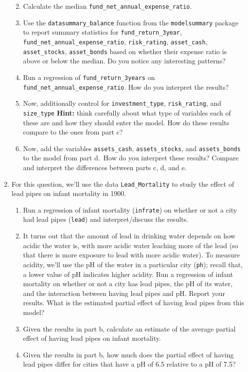 \documentclass[
  letterpaper,
  DIV=11,
  numbers=noendperiod]{scrreprt}
\begin{document}
\begin{enumerate}
  \begin{enumerate}
  \def\labelenumii{\alph{enumii})}
  \item
    Calculate the median \texttt{fund\_net\_annual\_expense\_ratio}.
  \item
    Use the \texttt{datasummary\_balance} function from the
    \texttt{modelsummary} package to report summary statistics for
    \texttt{fund\_return\_3year},
    \texttt{fund\_net\_annual\_expense\_ratio}, \texttt{risk\_rating},
    \texttt{asset\_cash}, \texttt{asset\_stocks}, \texttt{asset\_bonds}
    based on whether their expense ratio is above or below the median.
    Do you notice any interesting patterns?
  \item
    Run a regression of \texttt{fund\_return\_3years} on
    \texttt{fund\_net\_annual\_expense\_ratio}. How do you interpret the
    results?
  \item
    Now, additionally control for \texttt{investment\_type},
    \texttt{risk\_rating}, and \texttt{size\_type} \textbf{Hint:} think
    carefully about what type of variables each of these are and how
    they should enter the model. How do these results compare to the
    ones from part c?
  \item
    Now, add the variables \texttt{assets\_cash},
    \texttt{assets\_stocks}, and \texttt{assets\_bonds} to the model
    from part d.~How do you interpret these results? Compare and
    interpret the differences between parts c, d, and e.
  \end{enumerate}
\item
  For this question, we'll use the data \texttt{Lead\_Mortality} to
  study the effect of lead pipes on infant mortality in 1900.

  \begin{enumerate}
  \def\labelenumii{\alph{enumii})}
  \item
    Run a regression of infant mortality (\texttt{infrate}) on whether
    or not a city had lead pipes (\texttt{lead}) and interpret/discuss
    the results.
  \item
    It turns out that the amount of lead in drinking water depends on
    how acidic the water is, with more acidic water leaching more of the
    lead (so that there is more exposure to lead with more acidic
    water). To measure acidity, we'll use the pH of the water in a
    particular city (\texttt{ph}); recall that, a lower value of pH
    indicates higher acidity. Run a regression of infant mortality on
    whether or not a city has lead pipes, the pH of its water, and the
    interaction between having lead pipes and pH. Report your results.
    What is the estimated partial effect of having lead pipes from this
    model?
  \item
    Given the results in part b, calculate an estimate of the average
    partial effect of having lead pipes on infant mortality.
  \item
    Given the results in part b, how much does the partial effect of
    having lead pipes differ for cities that have a pH of 6.5 relative
    to a pH of 7.5?
  \end{enumerate}
\end{enumerate}
\end{document}
